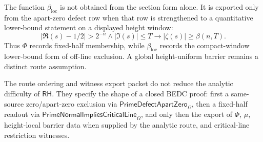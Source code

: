 \begin{principle}
\label{prin:rh-proof-obligation-barrier-export-analytic-content}
The function $\beta_{\mathrm{loc}}$ is not obtained from the section form
alone. It is exported only from the apart-zero defect row when that row is
strengthened to a quantitative lower-bound statement on a displayed height
window:
$$
|\Re(s)-1/2|>2^{-n}
\wedge
|\Im(s)|\le T
\to
|\zeta(s)|\ge \beta(n,T).
$$
Thus $\Phi$ records fixed-half membership, while $\beta_{\mathrm{loc}}$
records the compact-window lower-bound form of off-line exclusion. A global
height-uniform barrier remains a distinct route assumption.
\end{principle}

\begin{principle}
\label{prin:rh-proof-obligation-witness-export-boundary}
The route ordering and witness export packet do not reduce the analytic
difficulty of $\mathsf{RH}$. They specify the shape of a closed BEDC proof:
first a same-source zero/apart-zero exclusion via
$\mathsf{PrimeDefectApartZero}_{\Omega}$, then a fixed-half readout via
$\mathsf{PrimeNormalImpliesCriticalLine}_{\Omega}$, and only then the
export of $\Phi$, $\mu$, height-local barrier data when supplied by the
analytic route, and critical-line restriction witnesses.
\end{principle}
